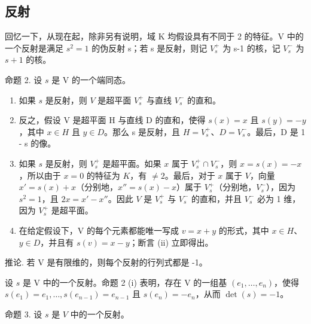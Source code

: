 \subsection{反射}

回忆一下，从现在起，除非另有说明，域 K 均假设具有不同于 2 的特征。V 中的一个反射是满足 \(s^{2}=1\) 的伪反射 s；若 s 是反射，则记 \(V_{s}^{+}\) 为 s-1 的核，记 \(V_{s}^{-}\) 为 \(s+1\) 的核。

命题 2. 设 \(s\) 是 V 的一个端同态。

\begin{enumerate}
\def\labelenumi{(\roman{enumi})}
\item
  如果 \(s\) 是反射，则 \(V\) 是超平面 \(V_s^+\) 与直线 \(V_s^-\) 的直和。
\item
反之，假设 V 是超平面 H 与直线 D 的直和，使得 \(s(x) = x\) 且 \(s(y) = -y\)，其中 \(x \in H\) 且 \(y \in D\)。那么 s 是反射，且 \(H = V_{s}^{+}\)、\(D = V_{s}^{-}\)。最后，D 是 1 - s 的像。
\item
  如果 \(s\) 是反射，则 \(V_{s}^{+}\) 是超平面。如果 \(x\) 属于 \(V_{s}^{+} \cap V_{s}^{-}\)，则 \(x = s(x) = -x\)，所以由于 \(x = 0\) 的特征为 \(K\)，有 \(\neq 2\)。最后，对于 \(x\) 属于 \(V\)，向量 \(x' = s(x) + x\)（分别地，\(x'' = s(x) - x\)）属于 \(V_{s}^{+}\)（分别地，\(V_{s}^{-}\)），因为 \(s^2 = 1\)，且 \(2x = x' - x''\)。因此 \(V\) 是 \(V_{s}^{+}\) 与 \(V_{s}^{-}\) 的直和，并且 \(V_{s}^{-}\) 必为 1 维，因为 \(V_{s}^{+}\) 是超平面。
\item
  在给定假设下，V 的每个元素都能唯一写成 \(v = x + y\) 的形式，其中 \(x \in H\)、\(y \in D\)，并且有 \(s(v) = x - y\)；断言 (ii) 立即得出。
\end{enumerate}

推论. 若 V 是有限维的，则每个反射的行列式都是 -1。

设 \(s\) 是 V 中的一个反射。命题 2 (i) 表明，存在 V 的一组基 \((e_1, \ldots, e_n)\)，使得 \(s(e_1) = e_1, \ldots, s(e_{n-1}) = e_{n-1}\) 且 \(s(e_n) = -e_n\)，从而 \(\det(s) = -1\)。

命题 3. 设 \(s\) 是 \(V\) 中的一个反射。

